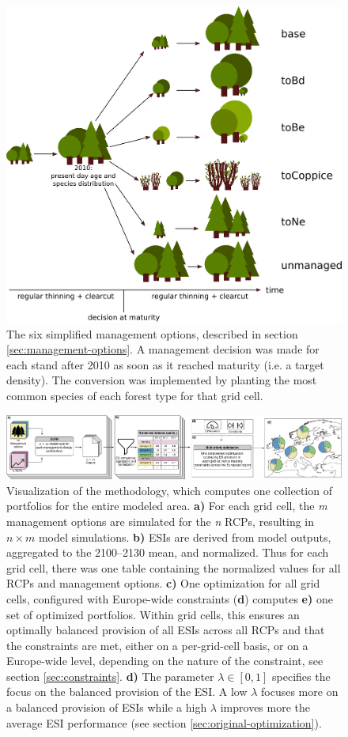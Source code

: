 \documentclass[]{article}
\begin{document}
\begin{figure}[h!]
	\centering
	\includegraphics[width=0.5\linewidth]{paper_figs/management_scenarios.png}
	\caption{The six simplified management options, described in section \ref{sec:management-options}. A management decision was made for each stand after 2010 as soon as it reached maturity (i.e. a target density). The conversion was implemented by planting the most common species of each forest type for that grid cell.}
	\label{fig:management}
\end{figure}






\begin{figure}[!h]
	\includegraphics[width=\linewidth]{paper_figs/optimization_newmethod.png}
	\caption{Visualization of the methodology, which computes one collection of portfolios for the entire modeled area. 
		\textbf{a)} For each grid cell, the \textit{m} management options are simulated for the \textit{n} RCPs, resulting in $n\times m$ model simulations. 
		\textbf{b)} ESIs are derived from model outputs, aggregated to the 2100--2130 mean, and normalized. Thus for each grid cell, there was one table containing the normalized values for all RCPs and management options. 
		\textbf{c)} One optimization for all grid cells, configured with Europe-wide constraints (\textbf{d}) computes \textbf{e)} one set of optimized portfolios. Within grid cells, this ensures an optimally balanced provision of all ESIs across all RCPs and that the constraints are met, either on a per-grid-cell basis, or on a Europe-wide level, depending on the nature of the constraint, see section \ref{sec:constraints}.
		\textbf{d)} The parameter $\lambda \in [0, 1]$ specifies the focus on the balanced provision of the ESI. A low $\lambda$ focuses more on a balanced provision of ESIs while a high $\lambda$ improves more the average ESI performance (see section \ref{sec:original-optimization}).
	}
	\label{fig:newoptimization}
\end{figure}
\end{document}
